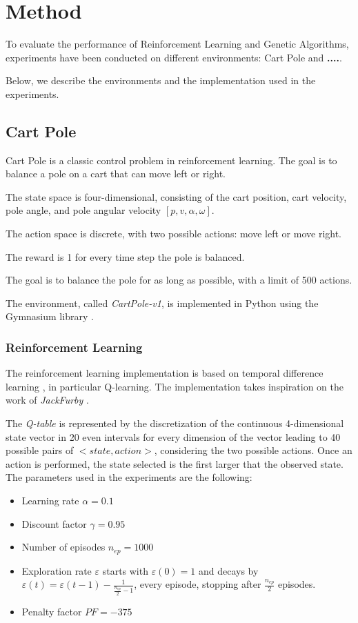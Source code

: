 \section{Method}
To evaluate the performance of Reinforcement Learning and Genetic Algorithms,
experiments have been conducted on different environments:
Cart Pole and \textbf{....}.

Below, we describe the environments and the implementation used in the experiments.
\subsection{Cart Pole}
Cart Pole is a classic control problem in reinforcement learning. 
The goal is to balance a pole on a cart that can move left or right. 

The state space is four-dimensional, consisting of the cart position, cart velocity, pole angle, and pole angular velocity $[p, v, \alpha, \omega]$. 

The action space is discrete, with two possible actions: move left or move right. 

The reward is 1 for every time step the pole is balanced.

The goal is to balance the pole for as long as possible, with a limit of 500 actions.

The environment, called \textit{CartPole-v1}, is implemented in Python using the Gymnasium library \cite{towers_gymnasium_2023}.

\subsubsection{Reinforcement Learning}
The reinforcement learning implementation is based on temporal difference learning \cite{sutton1998temporal}, 
in particular Q-learning.
The implementation takes inspiration on the work of \textit{JackFurby} \cite{JackFurbyCartPole}.

The \textit{Q-table} is represented by the discretization of the continuous 4-dimensional state vector in 20 even intervals for every dimension of the vector leading to 40 possible pairs of $<state,action>$, considering the two possible actions.
Once an action is performed, the state selected is the first larger that the observed state.\\
The parameters used in the experiments are the following:
\begin{itemize}
	\item Learning rate $\alpha = 0.1$
	\item Discount factor $\gamma = 0.95$
	\item Number of episodes $n_{ep} = 1000$
	\item Exploration rate $\varepsilon$ starts with $\varepsilon(0)=1$ and decays by $\varepsilon(t) = \varepsilon(t - 1) - \frac{1}{\frac{n_{ep}}{2} - 1}$, every episode, stopping after $\frac{n_{ep}}{2}$ episodes.
	\item Penalty factor $PF = -375$
\end{itemize}

